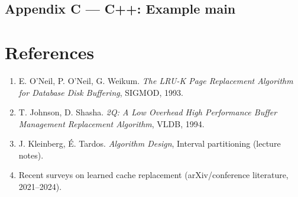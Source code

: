 \documentclass[11pt,a4paper]{article}
\begin{document}
\subsection*{Appendix C — C++: Example main}


\section*{References}
\begin{enumerate}[leftmargin=*]
  \item E. O'Neil, P. O'Neil, G. Weikum. \textit{The LRU-K Page Replacement Algorithm for Database Disk Buffering}, SIGMOD, 1993.
  \item T. Johnson, D. Shasha. \textit{2Q: A Low Overhead High Performance Buffer Management Replacement Algorithm}, VLDB, 1994.
  \item J. Kleinberg, É. Tardos. \textit{Algorithm Design}, Interval partitioning (lecture notes).
  \item Recent surveys on learned cache replacement (arXiv/conference literature, 2021–2024).
\end{enumerate}
\end{document}
